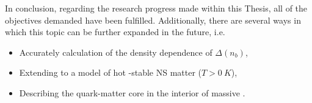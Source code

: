 In conclusion, regarding the research progress made within this Thesis, all of the objectives demanded have been fulfilled. Additionally, there are several ways in which this topic can be further expanded in the future, i.e.
\begin{itemize}
    \item Accurately calculation of the density dependence of $\Delta(n_b)$,
    \item Extending to a model of hot \textbeta-stable \gls{NS} matter ($T>0\:K$),
    \item Describing the quark-matter core in the interior of massive .
\end{itemize}
